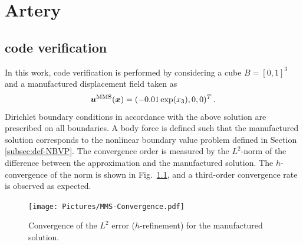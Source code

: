 \appendixtitleon

\chapter{Artery}

\section{code verification}
\label{app:VV-artery}


In this work, code verification is performed by considering a cube $B = [0,1]^3$ and a manufactured displacement field taken as 
\begin{equation}
    {\boldsymbol{u}}^{\textnormal{MMS}}({\boldsymbol{x}}) = (-0.01\exp(x_3), 0, 0)^T\,.
\end{equation}
Dirichlet boundary conditions in accordance with the above solution are prescribed on all boundaries. A body force is defined such that the manufactured solution corresponds to the nonlinear boundary value problem defined in Section \ref{subsec:def-NBVP}. The convergence order is measured by the $L^2$-norm of the difference between the approximation and the manufactured solution. The $h$-convergence of the norm is shown in Fig.~\ref{fig:mms}, and a third-order convergence rate is observed as expected.
\begin{figure}[ht!]
    \begin{center}
        \texttt{[image: Pictures/MMS-Convergence.pdf]}
    \end{center}
    \caption[Convergence of the $L^2$ error for the manufactured solution.]{Convergence of the $L^2$ error ($h$-refinement) for the manufactured solution.}
    \label{fig:mms}
\end{figure}

